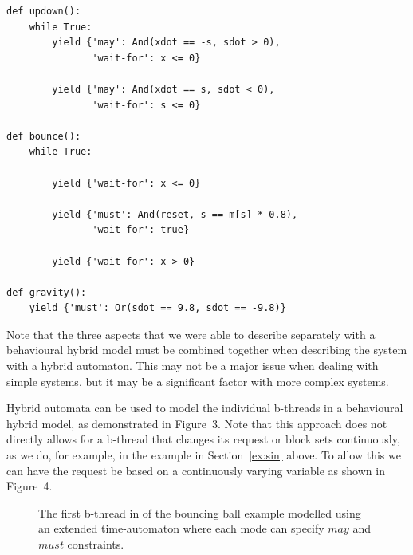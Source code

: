 \documentclass[11pt]{article}
\newcounter{example}
\begin{document}
\begin{lstlisting}[caption={B-Threads for the bouncing ball example.  \lstinline{updown} models that, repeatedly in a loop, the speed increases while the ball goes down and then it decreases while the ball goes up, \lstinline{bounce} model that a fraction of the speed is lost with every bounce, and \lstinline{gravity} models the acceleration.},captionpos=b,frame = single]
def updown():
    while True:
        yield {'may': And(xdot == -s, sdot > 0), 
               'wait-for': x <= 0}

        yield {'may': And(xdot == s, sdot < 0), 
               'wait-for': s <= 0}

def bounce():
    while True:
    
        yield {'wait-for': x <= 0}
        
        yield {'must': And(reset, s == m[s] * 0.8),
               'wait-for': true}
        
        yield {'wait-for': x > 0}
    
def gravity():
    yield {'must': Or(sdot == 9.8, sdot == -9.8)}
\end{lstlisting}


Note that the three aspects that we were able to describe separately with  a behavioural hybrid model must be combined together when describing the system with a hybrid automaton. This may not be a major issue when dealing with simple systems, but it may be a significant factor with more complex systems.

Hybrid automata can be used to model the individual b-threads in a behavioural hybrid model, as demonstrated in Figure~3. Note that this approach does not directly allows for a b-thread that changes its request or block sets continuously,  as we do, for example, in the example in Section~\ref{ex:sin} above. To allow this we can have the request be based on a continuously varying variable as shown in Figure~4.  



\begin{figure}[H]
	\begin{center}
		\label{fig:ha-b-threads-bouncingball}
	\end{center}
	\caption{The first b-thread in of the bouncing ball example modelled using an extended time-automaton where each mode can specify $may$ and $must$ constraints.}
\end{figure}
\end{document}
